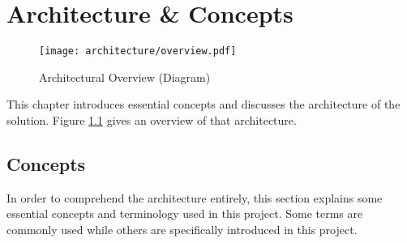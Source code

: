 \chapter{Architecture \& Concepts}

\begin{figure}[ht]
    \texttt{[image: architecture/overview.pdf]}
    \caption{Architectural Overview (Diagram)}
    \label{fig:architecture-overview}
\end{figure}

This chapter introduces essential concepts and discusses the architecture of the solution. Figure \ref{fig:architecture-overview} gives an overview of that architecture.

\section{Concepts}

In order to comprehend the architecture entirely, this section explains some essential concepts and terminology used in this project. Some terms are commonly used while others are specifically introduced in this project.

